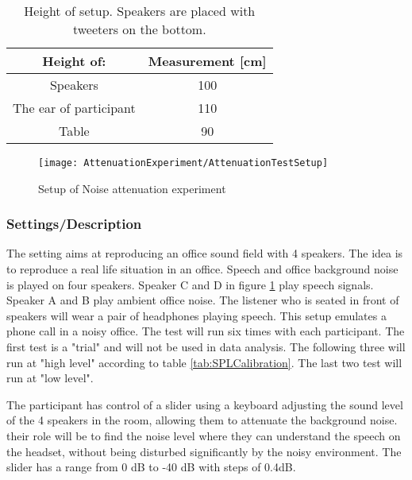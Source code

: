 \begin{table} [h]
	\centering
	\begin{tabular}{c c} \toprule
		\centering
		Height of:			 			& Measurement [cm] 	\\ \bottomrule
		Speakers					  	& 100				\\
		The ear of participant			& 110				\\ 
		Table							& 90				\\ \bottomrule 
	\end{tabular}
	\caption{Height of setup. Speakers are placed with tweeters on the bottom.}
	\label{Tab:NoiseAttenuationDimensions}
\end{table}


\begin{figure}[H]
	\centering
%	
	\texttt{[image: AttenuationExperiment/AttenuationTestSetup]}
	\caption{Setup of Noise attenuation experiment}
	\label{Fig:NoiseAttenuationExperimet}
\end{figure}


\subsubsection{Settings/Description}
The setting aims at reproducing an office sound field with 4 speakers. 
The idea is to reproduce a real life situation in an office. Speech and office background noise is played on four speakers. Speaker C and D in figure \ref{Fig:NoiseAttenuationExperimet} play speech signals. Speaker A and B play ambient office noise. The listener who is seated in front of speakers will wear a pair of headphones playing speech. This setup emulates a phone call in a noisy office. The test will run six times with each participant. The first test is a "trial" and will not be used in data analysis. The following three will run at "high level" according to table \ref{tab:SPLCalibration}. The last two test will run at "low level". 

The participant has control of a slider using a keyboard adjusting the sound level of the 4 speakers in the room, allowing them to attenuate the background noise. their role will be to find the noise level where they can understand the speech on the headset, without being disturbed significantly by the noisy environment. The slider has a range from 0 dB to -40 dB with steps of 0.4dB. 

